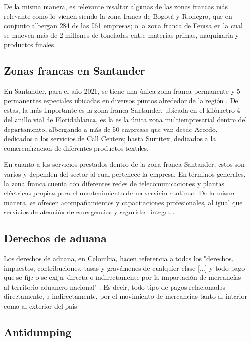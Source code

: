 \documentclass[10pt]{article}
\begin{document}
    De la misma manera, es relevante resaltar algunas de las zonas francas más relevante como lo vienen siendo la zona franca de Bogotá y Rionegro, que en conjunto albergan 284 de las 961 empresas; o la zona franca de Femsa en la cual se mueven más de 2 millones de toneladas entre materias primas, maquinaria y productos finales. 
    \cite{ref:zonafrancabarranquilla}

    \subsection{Zonas francas en Santander}

    En Santander, para el año 2021, se tiene una única zona franca permanente y 5 permanentes especiales ubicadas en diversos puntos alrededor de la región \cite{ref:investing}. De estas, la más importante es la zona franca Santander, ubicada en el kilómetro 4 del anillo vial de Floridablanca, es la es la única zona multiempresarial dentro del departamento, albergando a más de 50 empresas que van desde Accedo, dedicados a los servicios de Call Centers; hasta Surtitex, dedicados a la comercialización de diferentes productos textiles.
    \cite{ref:zonafrancasantander}
    
    En cuanto a los servicios prestados dentro de la zona franca Santander, estos son varios y dependen del sector al cual pertenece la empresa. En términos generales, la zona franca cuenta con diferentes redes de telecomunicaciones y plantas eléctricas propias para el mantenimiento de un servicio continuo. De la misma manera, se ofrecen acompañamientos y capacitaciones profesionales, al igual que servicios de atención de emergencias y seguridad integral.
    \cite{ref:zonafrancasantander}


    \subsection{Derechos de aduana}

    Los derechos de aduana, en Colombia, hacen referencia a todos los "derechos, impuestos, contribuciones, tasas y gravámenes de cualquier clase [...] y todo pago que se fije o se exija, directa o indirectamente por la importación de mercancías al territorio aduanero nacional" \cite{ref:aduanas}. Es decir, todo tipo de pagos relacionados directamente, o indirectamente, por el movimiento de mercancías tanto al interior como al exterior del país. 

    \subsection{Antidumping}
\end{document}
